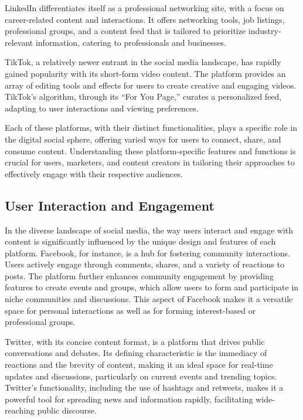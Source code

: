 \documentclass[
]{book}
\begin{document}
LinkedIn differentiates itself as a professional networking site, with a focus on career-related content and interactions. It offers networking tools, job listings, professional groups, and a content feed that is tailored to prioritize industry-relevant information, catering to professionals and businesses.

TikTok, a relatively newer entrant in the social media landscape, has rapidly gained popularity with its short-form video content. The platform provides an array of editing tools and effects for users to create creative and engaging videos. TikTok's algorithm, through its ``For You Page,'' curates a personalized feed, adapting to user interactions and viewing preferences.

Each of these platforms, with their distinct functionalities, plays a specific role in the digital social sphere, offering varied ways for users to connect, share, and consume content. Understanding these platform-specific features and functions is crucial for users, marketers, and content creators in tailoring their approaches to effectively engage with their respective audiences.

\hypertarget{user-interaction-and-engagement}{%
\subsection*{User Interaction and Engagement}\label{user-interaction-and-engagement}}

In the diverse landscape of social media, the way users interact and engage with content is significantly influenced by the unique design and features of each platform. Facebook, for instance, is a hub for fostering community interactions. Users actively engage through comments, shares, and a variety of reactions to posts. The platform further enhances community engagement by providing features to create events and groups, which allow users to form and participate in niche communities and discussions. This aspect of Facebook makes it a versatile space for personal interactions as well as for forming interest-based or professional groups.

Twitter, with its concise content format, is a platform that drives public conversations and debates. Its defining characteristic is the immediacy of reactions and the brevity of content, making it an ideal space for real-time updates and discussions, particularly on current events and trending topics. Twitter's functionality, including the use of hashtags and retweets, makes it a powerful tool for spreading news and information rapidly, facilitating wide-reaching public discourse.
\end{document}
